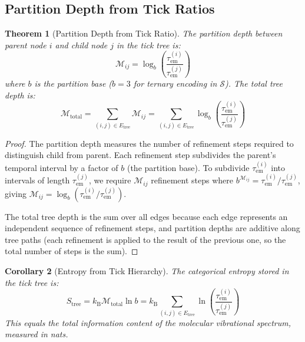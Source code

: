 \documentclass[11pt,a4paper]{article}
\newtheorem{theorem}{Theorem}[section]
\newtheorem{corollary}[theorem]{Corollary}
\theoremstyle{definition}
\theoremstyle{remark}
\newcommand{\kB}{k_{\mathrm{B}}}
\newcommand{\Sspace}{\mathcal{S}}
\newcommand{\Depth}{\mathcal{M}}
\newcommand{\tem}{\tau_{\mathrm{em}}}
\begin{document}
\subsection{Partition Depth from Tick Ratios}

\begin{theorem}[Partition Depth from Tick Ratio]
\label{thm:partition_depth_tick}
The partition depth between parent node $i$ and child node $j$ in the tick tree is:
\begin{equation}
\Depth_{ij} = \log_b\!\left(\frac{\tem^{(i)}}{\tem^{(j)}}\right)
\label{eq:partition_depth_tick}
\end{equation}
where $b$ is the partition base ($b = 3$ for ternary encoding in $\Sspace$). The total tree depth is:
\begin{equation}
\Depth_{\mathrm{total}} = \sum_{(i,j) \in E_{\mathrm{tree}}} \Depth_{ij} = \sum_{(i,j) \in E_{\mathrm{tree}}} \log_b\!\left(\frac{\tem^{(i)}}{\tem^{(j)}}\right)
\label{eq:total_tree_depth}
\end{equation}
\end{theorem}

\begin{proof}
The partition depth measures the number of refinement steps required to distinguish child from parent. Each refinement step subdivides the parent's temporal interval by a factor of $b$ (the partition base). To subdivide $\tem^{(i)}$ into intervals of length $\tem^{(j)}$, we require $\Depth_{ij}$ refinement steps where $b^{\Depth_{ij}} = \tem^{(i)}/\tem^{(j)}$, giving $\Depth_{ij} = \log_b(\tem^{(i)}/\tem^{(j)})$.

The total tree depth is the sum over all edges because each edge represents an independent sequence of refinement steps, and partition depths are additive along tree paths (each refinement is applied to the result of the previous one, so the total number of steps is the sum).
\end{proof}

\begin{corollary}[Entropy from Tick Hierarchy]
\label{cor:entropy_tick}
The categorical entropy stored in the tick tree is:
\begin{equation}
S_{\mathrm{tree}} = \kB \Depth_{\mathrm{total}} \ln b = \kB \sum_{(i,j) \in E_{\mathrm{tree}}} \ln\!\left(\frac{\tem^{(i)}}{\tem^{(j)}}\right)
\label{eq:tree_entropy}
\end{equation}
This equals the total information content of the molecular vibrational spectrum, measured in nats.
\end{corollary}
\end{document}
